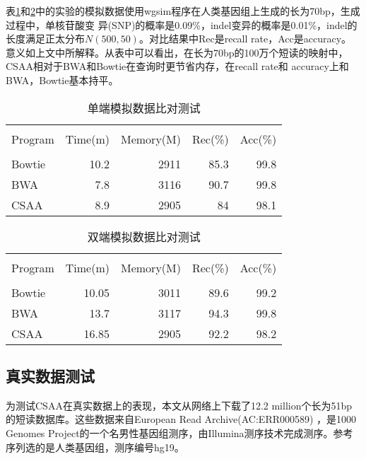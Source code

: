 表\ref{tab:singleend}和\ref{tab:pairend}中的实验的模拟数据使用wgsim程序在人类基因组上生成的长为70bp，生成过程中，单核苷酸变
异(SNP)的概率是0.09\%，indel变异的概率是0.01\%，indel的长度满足正太分布$N(500,50)$。对比结果中Rec是recall rate，Acc是accuracy。
意义如上文中所解释。从表中可以看出，在长为70bp的100万个短读的映射中，CSAA相对于BWA和Bowtie在查询时更节省内存，在recall rate和
accuracy上和BWA，Bowtie基本持平。%


\begin{table}[htbp]
    \caption{单端模拟数据比对测试}
    \label{tab:singleend}
    \centering
    \begin{tabular}{lrrrr}
       \toprule \\
       Program&Time(m)&Memory(M)&Rec(\%)&Acc(\%)\\
       \midrule \\
       Bowtie&10.2&2911&85.3&99.8\\
       BWA&7.8&3116&90.7&99.8\\
       CSAA&8.9&2905&84&98.1\\
       \bottomrule
    \end{tabular}
\end{table}


\begin{table}[htbp]
    \caption{双端模拟数据比对测试}
    \label{tab:pairend}
    \centering
    \begin{tabular}{lrrrr}
       \toprule \\
       Program&Time(m)&Memory(M)&Rec(\%)&Acc(\%)\\
       \midrule \\
       Bowtie&10.05&3011&89.6&99.2\\
       BWA&13.7&3117&94.3&99.8\\
       CSAA&16.85&2905&92.2&98.2\\
       \bottomrule
    \end{tabular}
\end{table}

\subsection{真实数据测试}
为测试CSAA在真实数据上的表现，本文从网络上下载了12.2 million个长为51bp的短读数据库。这些数据来自European Read Archive(AC:ERR000589)
，是1000 Genomes Project的一个名男性基因组测序，由Illumina测序技术完成测序。参考序列选的是人类基因组，测序编号hg19。


